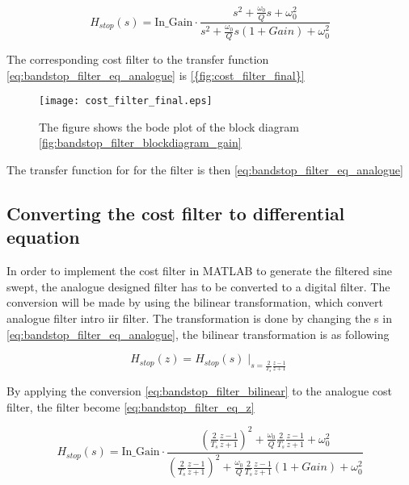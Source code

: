\begin{equation}\label{eq:bandstop_filter_eq_analogue}
H_{stop}(s) = \text{In_Gain} \cdot \frac{s^2+\frac{\omega_0}{Q}s+\omega_0^2}{s^2+\frac{\omega_0}{Q}s(1+Gain)+\omega_0^2}
\end{equation}

The corresponding cost filter to the transfer function \autoref{eq:bandstop_filter_eq_analogue} is \autoref{{fig:cost_filter_final}}

\begin{figure}[H]
	\centering
	\texttt{[image: cost\_filter\_final.eps]}
	\caption{The figure shows the bode plot of the block diagram \autoref{fig:bandstop_filter_blockdiagram_gain}}
		\label{fig:cost_filter_final}
\end{figure}


The transfer function for for the filter is then \autoref{eq:bandstop_filter_eq_analogue}



\subsection{Converting the cost filter to differential equation}
In order to implement the cost filter in MATLAB to generate the filtered sine swept, the analogue designed filter has to be converted to a digital filter. The conversion will be made by using the bilinear transformation, which convert analogue filter intro \gls{iir} filter.  The transformation is done by changing the s in \autoref{eq:bandstop_filter_eq_analogue}, the bilinear transformation is as following 

\begin{equation}\label{eq:bandstop_filter_bilinear}
H_{stop}(z) = H_{stop}(s) \mid_{s=\frac{2}{T_s}\frac{z-1}{z+1}} 
\end{equation}

    \startexplain
    \stopexplain

By applying the conversion \autoref{eq:bandstop_filter_bilinear} to the analogue cost filter, the filter become \autoref{eq:bandstop_filter_eq_z}

\begin{equation}\label{eq:bandstop_filter_eq_z}
H_{stop}(s) = \text{In_Gain} \cdot \frac{(\frac{2}{T_s}\frac{z-1}{z+1})^2+\frac{\omega_0}{Q}\frac{2}{T_s}\frac{z-1}{z+1}+\omega_0^2}{(\frac{2}{T_s}\frac{z-1}{z+1})^2+\frac{\omega_0}{Q}\frac{2}{T_s}\frac{z-1}{z+1}(1+Gain)+\omega_0^2}
\end{equation}

